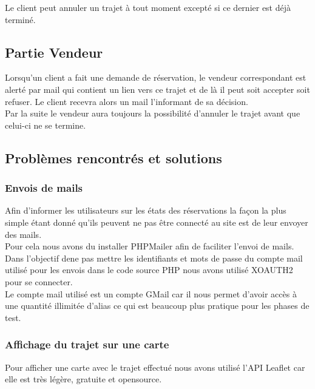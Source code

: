 \documentclass{article}
\begin{document}
        Le client peut annuler un trajet à tout moment excepté si ce dernier est déjà terminé.
    
    \subsection{Partie Vendeur}
        Lorsqu'un client a fait une demande de réservation, le vendeur correspondant est alerté par mail qui contient un lien vers ce trajet et de là il peut soit accepter soit refuser. Le client recevra alors un mail l'informant de sa décision.
        \\
        
        Par la suite le vendeur aura toujours la possibilité d'annuler le trajet avant que celui-ci ne se termine.
            
            
    \subsection{Problèmes rencontrés et solutions}
        \subsubsection{Envois de mails}
            Afin d'informer les utilisateurs sur les états des réservations la façon la plus simple étant donné qu'ils peuvent ne pas être connecté au site est de leur envoyer des mails.
            \\
            
            Pour cela nous avons du installer PHPMailer afin de faciliter l'envoi de mails.
            Dans l'objectif dene pas mettre les identifiants et mots de passe du compte mail utilisé pour les envois dans le code source PHP nous avons utilisé XOAUTH2 pour se connecter.
            \\
            
            Le compte mail utilisé est un compte GMail car il nous permet d'avoir accès à une quantité illimitée d'alias ce qui est beaucoup plus pratique pour les phases de test.
        
        \subsubsection{Affichage du trajet sur une carte}
            Pour afficher une carte avec le trajet effectué nous avons utilisé l'API Leaflet car elle est très légère, gratuite et opensource.
            \\
            
\end{document}

